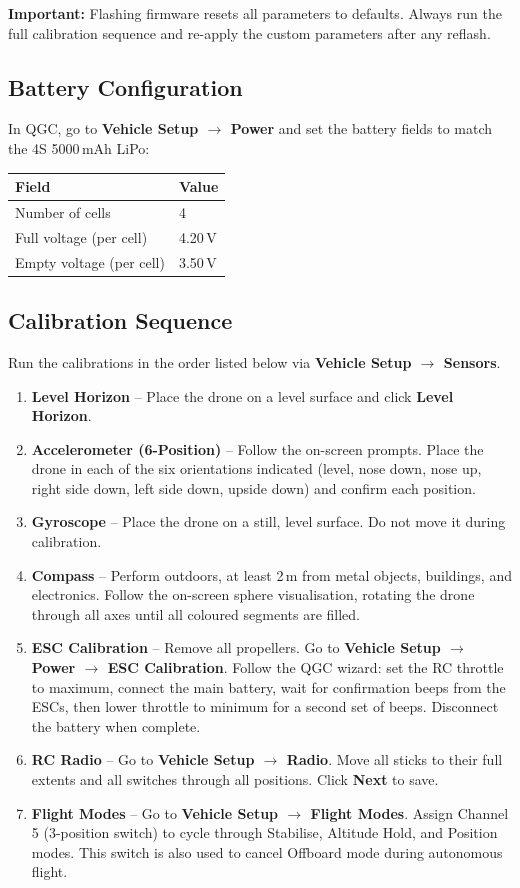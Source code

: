 \documentclass{article}
\begin{document}
\textbf{Important:} Flashing firmware resets all parameters to defaults. Always run the full calibration sequence and re-apply the custom parameters after any reflash.

\subsection{Battery Configuration}

In QGC, go to \textbf{Vehicle Setup $\rightarrow$ Power} and set the battery fields to match the 4S 5000\,mAh LiPo:

\begin{tabular}{ll}
\toprule
\textbf{Field} & \textbf{Value} \\
\midrule
Number of cells & 4 \\
Full voltage (per cell) & 4.20\,V \\
Empty voltage (per cell) & 3.50\,V \\
\bottomrule
\end{tabular}

\subsection{Calibration Sequence}

Run the calibrations in the order listed below via \textbf{Vehicle Setup $\rightarrow$ Sensors}.

\begin{enumerate}
    \item \textbf{Level Horizon} -- Place the drone on a level surface and click \textbf{Level Horizon}.
    \item \textbf{Accelerometer (6-Position)} -- Follow the on-screen prompts. Place the drone in each of the six orientations indicated (level, nose down, nose up, right side down, left side down, upside down) and confirm each position.
    \item \textbf{Gyroscope} -- Place the drone on a still, level surface. Do not move it during calibration.
    \item \textbf{Compass} -- Perform outdoors, at least 2\,m from metal objects, buildings, and electronics. Follow the on-screen sphere visualisation, rotating the drone through all axes until all coloured segments are filled.
    \item \textbf{ESC Calibration} -- Remove all propellers. Go to \textbf{Vehicle Setup $\rightarrow$ Power $\rightarrow$ ESC Calibration}. Follow the QGC wizard: set the RC throttle to maximum, connect the main battery, wait for confirmation beeps from the ESCs, then lower throttle to minimum for a second set of beeps. Disconnect the battery when complete.
    \item \textbf{RC Radio} -- Go to \textbf{Vehicle Setup $\rightarrow$ Radio}. Move all sticks to their full extents and all switches through all positions. Click \textbf{Next} to save.
    \item \textbf{Flight Modes} -- Go to \textbf{Vehicle Setup $\rightarrow$ Flight Modes}. Assign Channel 5 (3-position switch) to cycle through Stabilise, Altitude Hold, and Position modes. This switch is also used to cancel Offboard mode during autonomous flight.
\end{enumerate}
\end{document}

